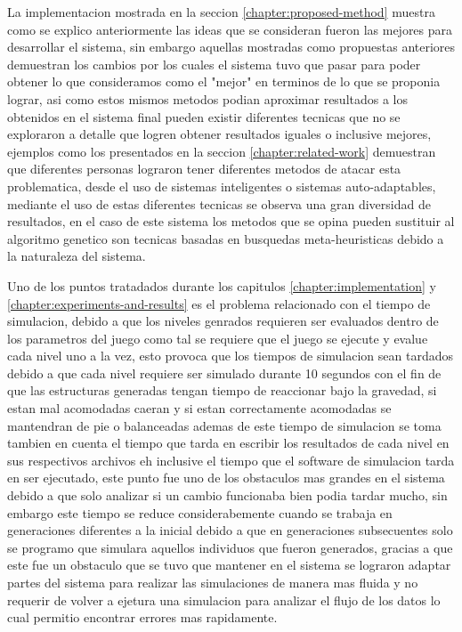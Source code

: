 La implementacion mostrada en la seccion \ref{chapter:proposed-method} muestra
como se explico anteriormente las ideas que se consideran fueron las mejores
para desarrollar el sistema, sin embargo aquellas mostradas como propuestas
anteriores demuestran los cambios por los cuales el sistema tuvo que pasar para
poder obtener lo que consideramos como el "mejor" en terminos de lo que se
proponia lograr, asi como estos mismos metodos podian aproximar resultados a los
obtenidos en el sistema final pueden existir diferentes tecnicas que no se
exploraron a detalle que logren obtener resultados iguales o inclusive mejores,
ejemplos como los presentados en la seccion \ref{chapter:related-work}
demuestran que diferentes personas lograron tener diferentes metodos de atacar
esta problematica, desde el uso de sistemas inteligentes o sistemas
auto-adaptables, mediante el uso de estas diferentes tecnicas se observa una
gran diversidad de resultados, en el caso de este sistema los metodos que se
opina pueden sustituir al algoritmo genetico son tecnicas basadas en busquedas
meta-heuristicas debido a la naturaleza del sistema.

Uno de los puntos tratadados durante los capitulos \ref{chapter:implementation}
y \ref{chapter:experiments-and-results} es el problema relacionado con el tiempo
de simulacion, debido a que los niveles genrados requieren ser evaluados dentro
de los parametros del juego como tal se requiere que el juego se ejecute y
evalue cada nivel uno a la vez, esto provoca que los tiempos de simulacion sean
tardados debido a que cada nivel requiere ser simulado durante 10 segundos con
el fin de que las estructuras generadas tengan tiempo de reaccionar bajo la
gravedad, si estan mal acomodadas caeran y si estan correctamente acomodadas se
mantendran de pie o balanceadas ademas de este tiempo de simulacion se toma
tambien en cuenta el tiempo que tarda en escribir los resultados de cada nivel
en sus respectivos archivos eh inclusive el tiempo que el software de simulacion
tarda en ser ejecutado, este punto fue uno de los obstaculos mas grandes en el
sistema debido a que solo analizar si un cambio funcionaba bien podia tardar
mucho, sin embargo este tiempo se reduce considerabemente cuando se trabaja en
generaciones diferentes a la inicial debido a que en generaciones subsecuentes
solo se programo que simulara aquellos individuos que fueron generados, gracias
a que este fue un obstaculo que se tuvo que mantener en el sistema se lograron
adaptar partes del sistema para realizar las simulaciones de manera mas fluida y
no requerir de volver a ejetura una simulacion para analizar el flujo de los
datos lo cual permitio encontrar errores mas rapidamente.

